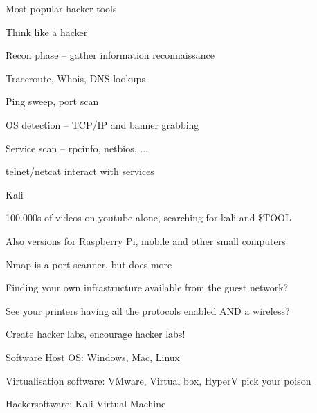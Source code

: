 \documentclass[Screen16to9,17pt]{foils}
\begin{document}
\vskip 5mm
\centerline{Most popular hacker tools }



\begin{list1}
\item Think like a hacker
\item Recon phase -- gather information reconnaissance
\begin{list2}
\item Traceroute, Whois, DNS lookups
\item Ping sweep, port scan
\item OS detection -- TCP/IP and banner grabbing
\item Service scan -- rpcinfo, netbios, ...
\item telnet/netcat interact with services
\end{list2}
\end{list1}



\begin{list1}
\item  Kali 
\item 100.000s of videos on youtube alone, searching for kali and \$TOOL
\item Also versions for Raspberry Pi, mobile and other small computers
\end{list1}







\begin{list2}
\item Nmap is a port scanner, but does more
\item Finding your own infrastructure available from the guest network?
\item See your printers having all the protocols enabled AND a wireless?
\end{list2}



\begin{list2}
\item Create hacker labs, encourage hacker labs!
\item Software Host OS: Windows, Mac, Linux
\item Virtualisation software: VMware, Virtual box, HyperV pick your poison
\item Hackersoftware: Kali Virtual Machine 
\end{list2}
\end{document}
